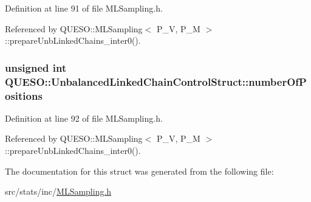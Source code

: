 Definition at line 91 of file M\-L\-Sampling.\-h.



Referenced by Q\-U\-E\-S\-O\-::\-M\-L\-Sampling$<$ P\-\_\-\-V, P\-\_\-\-M $>$\-::prepare\-Unb\-Linked\-Chains\-\_\-inter0().

\hypertarget{struct_q_u_e_s_o_1_1_unbalanced_linked_chain_control_struct_a6269fe962299d5013aa918a80273762e}{
\subsubsection[{number\-Of\-Positions}]{\setlength{\rightskip}{0pt plus 5cm}unsigned int Q\-U\-E\-S\-O\-::\-Unbalanced\-Linked\-Chain\-Control\-Struct\-::number\-Of\-Positions}}\label{struct_q_u_e_s_o_1_1_unbalanced_linked_chain_control_struct_a6269fe962299d5013aa918a80273762e}


Definition at line 92 of file M\-L\-Sampling.\-h.



Referenced by Q\-U\-E\-S\-O\-::\-M\-L\-Sampling$<$ P\-\_\-\-V, P\-\_\-\-M $>$\-::prepare\-Unb\-Linked\-Chains\-\_\-inter0().



The documentation for this struct was generated from the following file\-:\begin{DoxyCompactItemize}
\item 
src/stats/inc/\hyperlink{_m_l_sampling_8h}{M\-L\-Sampling.\-h}\end{DoxyCompactItemize}
